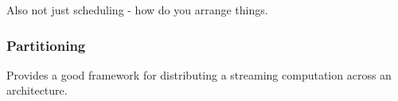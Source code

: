 Also not just scheduling - how do you arrange things.

\subsubsection{Partitioning}

Provides a good framework for distributing a streaming computation
across an architecture.







